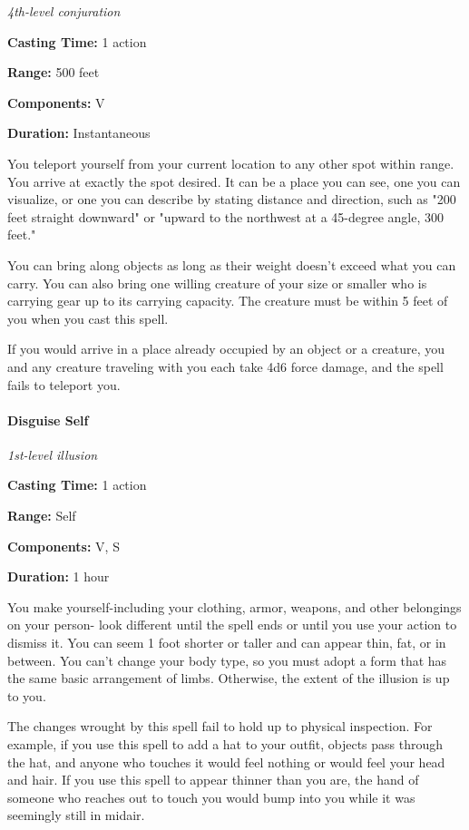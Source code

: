 \documentclass[
]{article}
\begin{document}
\emph{4th-level conjuration}

\textbf{Casting Time:} 1 action

\textbf{Range:} 500 feet

\textbf{Components:} V

\textbf{Duration:} Instantaneous

You teleport yourself from your current location to any other spot
within range. You arrive at exactly the spot desired. It can be a place
you can see, one you can visualize, or one you can describe by stating
distance and direction, such as "200 feet straight downward" or "upward
to the northwest at a 45-degree angle, 300 feet."

You can bring along objects as long as their weight doesn't exceed what
you can carry. You can also bring one willing creature of your size or
smaller who is carrying gear up to its carrying capacity. The creature
must be within 5 feet of you when you cast this spell.

If you would arrive in a place already occupied by an object or a
creature, you and any creature traveling with you each take 4d6 force
damage, and the spell fails to teleport you.

\hypertarget{disguise-self}{%
\paragraph{Disguise Self}\label{disguise-self}}

\emph{1st-level illusion}

\textbf{Casting Time:} 1 action

\textbf{Range:} Self

\textbf{Components:} V, S

\textbf{Duration:} 1 hour

You make yourself-including your clothing, armor, weapons, and other
belongings on your person- look different until the spell ends or until
you use your action to dismiss it. You can seem 1 foot shorter or taller
and can appear thin, fat, or in between. You can't change your body
type, so you must adopt a form that has the same basic arrangement of
limbs. Otherwise, the extent of the illusion is up to you.

The changes wrought by this spell fail to hold up to physical
inspection. For example, if you use this spell to add a hat to your
outfit, objects pass through the hat, and anyone who touches it would
feel nothing or would feel your head and hair. If you use this spell to
appear thinner than you are, the hand of someone who reaches out to
touch you would bump into you while it was seemingly still in midair.
\end{document}
